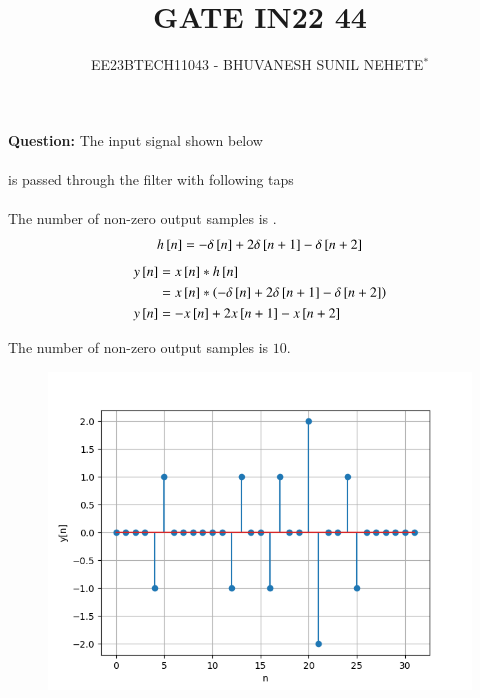 \documentclass[journal,12pt,twocolumn]{IEEEtran}
\theoremstyle{remark}
\begin{document}

\vspace{3cm}

\title{GATE IN22 44}
\author{EE23BTECH11043 - BHUVANESH SUNIL NEHETE$^{*}$%
}
\maketitle
\newpage
\bigskip

\renewcommand{\thefigure}{\theenumi}
\renewcommand{\thetable}{\theenumi}



\textbf{Question:}
The input signal shown below \\
\\
is passed through the filter with following taps\\
\\
The number of non-zero output samples is \underline{\hspace{1cm}}.\\

\solution
\begin{align}
    h{}\left[n\right]=-\delta{}\left[n\right]+2\delta{}\left[n+1\right]-\delta{}\left[n+2\right]
\end{align}
\begin{align}
    y{}\left[n\right]&=x{}\left[n\right]*h{}\left[n\right]\\
    &=x{}\left[n\right]*\left(-\delta{}\left[n\right]+2\delta{}\left[n+1\right]-\delta{}\left[n+2\right]\right)\\
    y{}\left[n\right]&=-x{}\left[n\right]+2x{}\left[n+1\right]-x{}\left[n+2\right]
\end{align}


The number of non-zero output samples is $10$.

\begin{figure}
    \centering
    \includegraphics[width=1\linewidth]{figs/fig.png}
\end{figure}
\end{document}
